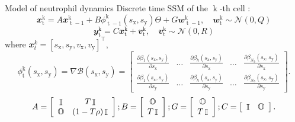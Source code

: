 \documentclass[mathserif,11pt]{beamer}
\DeclareMathOperator{\eye}{\mathbb{I}}
\DeclareMathOperator{\zeros}{\mathbb{O}}
\DeclareMathOperator{\td}{\mathrm{t}}
\DeclareMathOperator{\kd}{\mathrm{k}}
\begin{document}
\begin{frame}{Model of neutrophil dynamics}
\vspace{-0.1cm}
Discrete time SSM of the $\kd$-th cell :
\begin{equation*}\label{eq_dyn}
\mathbfit{x}^{\kd}_{\td} = A \mathbfit{x}^{\kd}_{\td-1} + B\phi_{\td-1}^{\kd}(s_{\mathrm{x}},s_{\mathrm{y}}) \Theta + G\mathbfit{w}^{\kd}_{\td-1}, \quad \mathbfit{w}^{\kd}_{\td} \sim \mathcal{N}(0, Q)
\end{equation*}
\begin{equation*}\label{eq_meas}
\mathbfit{y}^{\kd}_{\td} = C\mathbfit{x}^{\kd}_{\td} + \mathbfit{v}^{\kd}_{\td}, \quad \mathbfit{v}^{\kd}_{\td} \sim \mathcal{N}(0, R)
\end{equation*}
where $\mathbfit{x}^{k}_{t} = \left[ s_{\mathrm{x}}, s_{\mathrm{y}}, v_{\mathrm{x}}, v_{\mathrm{y}} \right]^{\top}$,
\begin{equation*}
\phi_{\td}^{\kd}(s_{\mathrm{x}},s_{\mathrm{y}}) = \nabla \mathcal{B}(s_{\mathrm{x}}, s_{\mathrm{y}}) = \left[\begin{array}{ccccc} \frac{ \partial\beta_1(s_{\mathrm{x}},s_{\mathrm{y}}) }{\partial s_{\mathrm{x}}} &
 \dots &\frac{ \partial\beta_h(s_{\mathrm{x}},s_{\mathrm{y}}) }{\partial s_{\mathrm{x}}}& \dots&\frac{ \partial\beta_{N_b}(s_{\mathrm{x}},s_{\mathrm{y}}) }{\partial s_{\mathrm{x}}} \\
\frac{ \partial\beta_1(s_{\mathrm{x}},s_{\mathrm{y}}) }{\partial s_{\mathrm{y}}} & \dots &\frac{ \partial\beta_h(s_{\mathrm{x}},s_{\mathrm{y}}) }{\partial s_{\mathrm{y}}}& \dots&\frac{ \partial\beta_{N_b}(s_{\mathrm{x}},s_{\mathrm{y}}) }{\partial s_{\mathrm{y}}}
\end{array}\right]. 
\end{equation*}
\begin{equation*}
A = \left[\begin{array}{cc}
\eye & T\eye \\
\zeros & (1-T\rho) \eye
\end{array}\right]; 
\hfil 
B = \left[\begin{array}{c}
\zeros \\ T \eye
\end{array}\right];
\hfil
G = \left[ \begin{array}{c}
\zeros \\ T\eye
\end{array} \right]; 
\hfil
C = \left[ \begin{array}{cc}
\eye & \zeros
\end{array}\right].
\end{equation*}
\end{frame}
\end{document}
